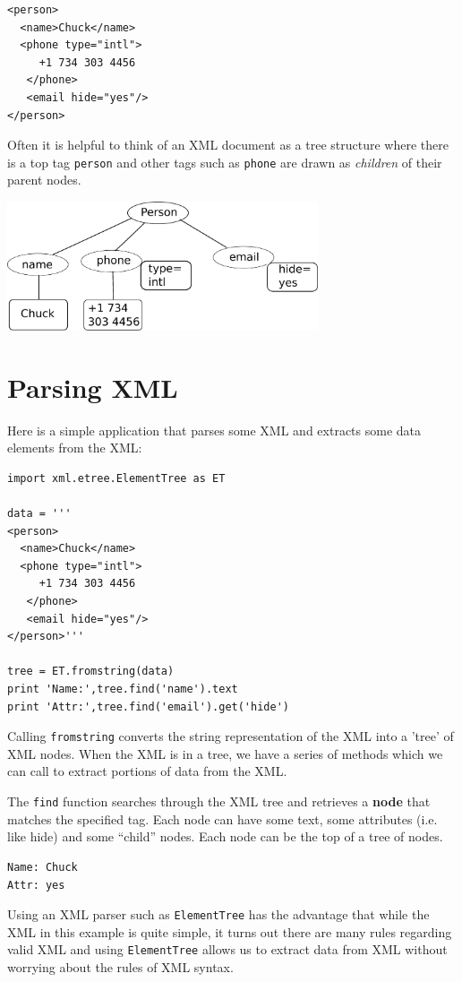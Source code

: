\documentclass[11pt]{book}
\begin{document}
\beforeverb
\begin{verbatim}
<person>
  <name>Chuck</name>
  <phone type="intl">
     +1 734 303 4456
   </phone>
   <email hide="yes"/>
</person>
\end{verbatim}
\afterverb
%
Often it is helpful to think of an XML document as a tree structure
where there is a top tag {\tt person} and other tags such as {\tt phone}
are drawn as \emph{children} of their parent nodes.

\beforefig
\centerline{\includegraphics[height=1.50in]{figs2/xml-tree.eps}}
\afterfig

\section{Parsing XML}

Here is a simple application that parses some XML
and extracts some data elements from the XML:

\beforeverb
\begin{verbatim}
import xml.etree.ElementTree as ET

data = '''
<person>
  <name>Chuck</name>
  <phone type="intl">
     +1 734 303 4456
   </phone>
   <email hide="yes"/>
</person>'''

tree = ET.fromstring(data)
print 'Name:',tree.find('name').text
print 'Attr:',tree.find('email').get('hide')
\end{verbatim}
\afterverb
%
Calling {\tt fromstring} converts the string representation
of the XML into a 'tree' of XML nodes.  When the
XML is in a tree, we have a series of methods which we can call to 
extract portions of data from the XML.  

The {\tt find} function searches through the 
XML tree and retrieves a {\bf node} that matches the specified tag.
Each node can have some text, some attributes (i.e. like hide) and
some ``child'' nodes.   Each node can be the top of a tree of nodes.

\beforeverb
\begin{verbatim}
Name: Chuck
Attr: yes
\end{verbatim}
\afterverb
%
Using an XML parser such as {\tt ElementTree} has the advantage
that while the XML in this example is quite simple, it turns
out there are many rules regarding valid XML and using 
{\tt ElementTree} allows us to extract data from XML without 
worrying about the rules of XML syntax.
\end{document}
